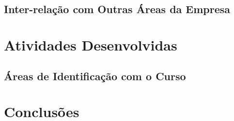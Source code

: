 \documentclass[
	12pt,				%
	oneside,			%
	a4paper,			%
	chapter=TITLE,		%
	section=TITLE,		%
	sumario=tradicional %
	english,			%
	french,				%
	spanish,			%
	brazil				%
	]{abntex2}
\begin{document}
\section{Inter-relação com Outras Áreas da Empresa}
\label{sec:relacaoareas}

\chapter{Atividades Desenvolvidas}
\label{chap:chap5}

\section{Áreas de Identificação com o Curso}
\label{sec:identcurso}

\chapter{Conclusões}
\label{chap:chap6}


%

\postextual

%


\printindex
\end{document}
